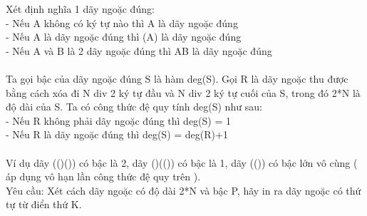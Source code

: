 Xét định nghĩa 1 dãy ngoặc đúng:   
\\   - Nếu A không có ký tự nào thì A là dãy ngoặc đúng   
\\   - Nếu A là dãy ngoặc đúng thì (A) là dãy ngoặc đúng   
\\   - Nếu A và B là 2 dãy ngoặc đúng thì AB là dãy ngoặc đúng   
\\
\\   Ta gọi bậc của dãy ngoặc đúng S là hàm deg(S). Gọi R là dãy ngoặc thu được bằng cách xóa đi N div 2 ký tự đầu và N div 2 ký tự cuối của S, trong đó 2*N là độ dài của S. Ta có công thức đệ quy tính deg(S) như sau:   
\\   - Nếu R không phải dãy ngoặc đúng thì deg(S) = 1   
\\   - Nếu R là dãy ngoặc đúng thì deg(S) = deg(R)+1   
\\
\\   Ví dụ dãy (()()) có bậc là 2, dãy ()(()) có bậc là 1, dãy (()) có bậc lớn vô cùng ( áp dụng vô hạn lần công thức đệ quy trên ).   
\\   Yêu cầu: Xét cách dãy ngoặc có độ dài 2*N và bậc P, hãy in ra dãy ngoặc có thứ tự từ điển thứ K.  

\